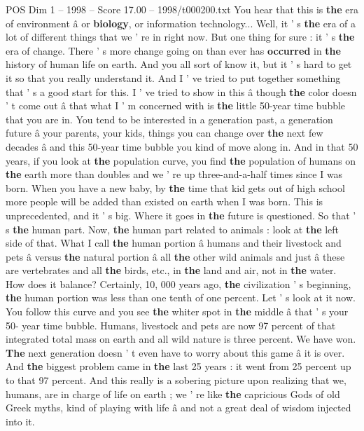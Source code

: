 \begin{textsample}{POS Dim 1 – 1998 – Score 17.00 – 1998/t000200.txt}  \label{ex:f1_pos_015}
You hear that this is \textbf{the} era of environment â or \textbf{biology}, or information technology...
Well, it ' s \textbf{the} era of a lot of different things that we ' re in right now.
But one thing for sure : it ' s \textbf{the} era of change.
There ' s more change going on than ever has \textbf{occurred} in \textbf{the} history of human life on earth.
And you all sort of know it, but it ' s hard to get it so that you really understand it.
And I ' ve tried to put together something that ' s a good start for this.
I ' ve tried to show in this â though \textbf{the} color doesn ' t come out â that what I ' m concerned with is \textbf{the} little 50-year time bubble that you are in.
You tend to be interested in a generation past, a generation future â your parents, your kids, things you can change over \textbf{the} next few decades â and this 50-year time bubble you kind of move along in.
And in that 50 years, if you look at \textbf{the} population curve, you find \textbf{the} population of humans on \textbf{the} earth more than doubles and we ' re up three-and-a-half times since I was born.
When you have a new baby, by \textbf{the} time that kid gets out of high school more people will be added than existed on earth when I was born.
This is unprecedented, and it ' s big.
Where it goes in \textbf{the} future is questioned.
So that ' s \textbf{the} human part.
Now, \textbf{the} human part related to animals : look at \textbf{the} left side of that.
What I call \textbf{the} human portion â humans and their livestock and pets â versus \textbf{the} natural portion â all \textbf{the} other wild animals and just â these are vertebrates and all \textbf{the} birds, etc., in \textbf{the} land and air, not in \textbf{the} water.
How does it balance?
Certainly, 10, 000 years ago, \textbf{the} civilization ' s beginning, \textbf{the} human portion was less than one tenth of one percent.
Let ' s look at it now.
You follow this curve and you see \textbf{the} whiter spot in \textbf{the} middle â that ' s your 50- year time bubble.
Humans, livestock and pets are now 97 percent of that integrated total mass on earth and all wild nature is three percent.
We have won. \textbf{The} next generation doesn ' t even have to worry about this game â it is over.
And \textbf{the} biggest problem came in \textbf{the} last 25 years : it went from 25 percent up to that 97 percent.
And this really is a sobering picture upon realizing that we, humans, are in charge of life on earth ; we ' re like \textbf{the} capricious Gods of old Greek myths, kind of playing with life â and not a great deal of wisdom injected into it.

\end{textsample}
